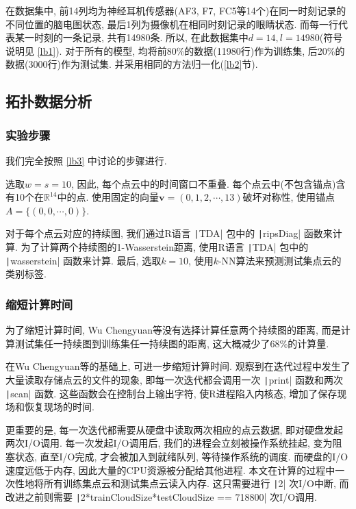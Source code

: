 \documentclass[12pt]{ctexart}
\begin{document}
在数据集中, 前14列均为神经耳机传感器(AF3, F7, FC5等14个)在同一时刻记录的不同位置的脑电图状态, 最后1列为摄像机在相同时刻记录的眼睛状态. 而每一行代表某一时刻的一条记录, 共有14980条. 所以, 在此数据集中$d=14, l=14980$(符号说明见 \ref{lb1}). 对于所有的模型, 均将前80\%的数据(11980行)作为训练集, 后20\%的数据(3000行)作为测试集. 并采用相同的方法归一化(\ref{lb2}节). 

\subsection{拓扑数据分析}
\subsubsection{实验步骤}
我们完全按照 \ref{lb3} 中讨论的步骤进行. 

选取$w=s=10$, 因此, 每个点云中的时间窗口不重叠. 每个点云中(不包含锚点)含有10个在$\mathbb{R}^{14}$中的点. 使用固定的向量$\bm{v}=(0,1,2,\cdots,13)$破坏对称性, 使用锚点$A=\{(0,0,\cdots,0)\}$. 

对于每个点云对应的持续图, 我们通过R语言 \texttt|TDA| 包中的 \texttt|ripsDiag| 函数来计算. 为了计算两个持续图的1-Wasserstein距离, 使用R语言 \texttt|TDA| 包中的 \texttt|wasserstein| 函数来计算. 最后, 选取$k=10$, 使用$k$-NN算法来预测测试集点云的类别标签. 
\subsubsection{缩短计算时间}
为了缩短计算时间, Wu Chengyuan等没有选择计算任意两个持续图的距离, 而是计算测试集任一持续图到训练集任一持续图的距离, 这大概减少了68\%的计算量\cite{ref22}. 

在Wu Chengyuan等的基础上, 可进一步缩短计算时间. 观察到在迭代过程中发生了大量读取存储点云的文件的现象, 即每一次迭代都会调用一次 \texttt|print| 函数和两次 \texttt|scan| 函数. 这些函数会在控制台上输出字符, 使R进程陷入内核态, 增加了保存现场和恢复现场的时间\cite{ref27}. 

更重要的是, 每一次迭代都需要从硬盘中读取两次相应的点云数据, 即对硬盘发起两次I/O调用. 每一次发起I/O调用后, 我们的进程会立刻被操作系统挂起, 变为阻塞状态, 直至I/O完成, 才会被加入到就绪队列, 等待操作系统的调度\cite{ref27}. 而硬盘的I/O速度远低于内存, 因此大量的CPU资源被分配给其他进程. 
本文在计算的过程中一次性地将所有训练集点云和测试集点云读入内存. 这只需要进行 \texttt|2| 次I/O中断, 而改进之前则需要
\texttt|2*trainCloudSize*testCloudSize == 718800| 次I/O调用.
\end{document}
